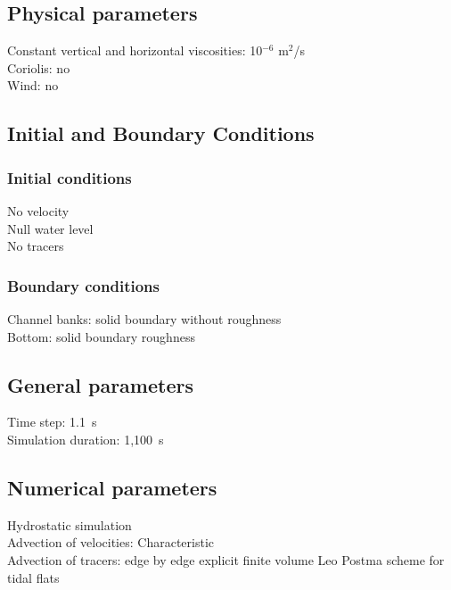 \subsection{Physical parameters}
%
Constant vertical and horizontal viscosities: 10$^{-6}$ m$^2$/s\\
Coriolis: no\\
Wind: no
%
%
%
%
%
%
\subsection{Initial and Boundary Conditions}
%
\subsubsection{Initial conditions}
%
No velocity\\
Null water level\\
No tracers
%
\subsubsection{Boundary conditions}
%
Channel banks: solid boundary without roughness\\
Bottom: solid boundary roughness
%
\subsection{General parameters}
%
Time step: 1.1~s\\
Simulation duration: 1,100~s
%
%
%
\subsection{Numerical parameters}
%
Hydrostatic simulation\\
Advection of velocities: Characteristic\\
Advection of tracers: edge by edge explicit finite volume Leo Postma
scheme for tidal flats
%
